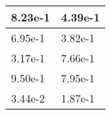 \documentclass{article}
\begin{document}
 \begin{tabular}{ |l | l | }
\hline
8.23e-1 & 4.39e-1 \\ \hline 
6.95e-1 & 3.82e-1 \\ \hline 
3.17e-1 & 7.66e-1 \\ \hline 
9.50e-1 & 7.95e-1 \\ \hline 
3.44e-2 & 1.87e-1 \\ \hline 
\hline
\end{tabular}
\end{document}
